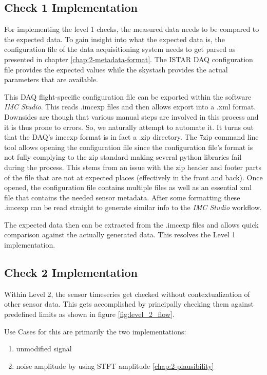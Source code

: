 \subsection{Check 1 Implementation}

For implementing the level 1 checks, the measured data needs to be compared to the expected data. To gain insight into what the expected data is, the configuration file of the data acquisitioning system needs to get parsed as presented in chapter \ref{chap:2-metadata-format}. The ISTAR DAQ configuration file provides the expected values while the skystash provides the actual parameters that are available.

This DAQ flight-specific configuration file can be exported within the software \textit{IMC Studio}. This reads .imcexp files and then allows export into a .xml format. Downsides are though that various manual steps are involved in this process and it is thus prone to errors. So, we naturally attempt to automate it. It turns out that the DAQ's imcexp format is in fact a .zip directory. The 7zip command line tool allows opening the configuration file since the configuration file's format is not fully complying to the zip standard making several python libraries fail during the process. This stems from an issue with the zip header and footer parts of the file that are not at expected places (effectively in the front and back). Once opened, the configuration file contains multiple files as well as an essential xml file that contains the needed sensor metadata. After some formatting these .imcexp can be read straight to generate similar info to the \textit{IMC Studio} workflow.

The expected data then can be extracted from the .imcexp files and allows quick comparison against the actually generated data. This resolves the Level 1 implementation.

\subsection{Check 2 Implementation}

Within Level 2, the sensor timeseries get checked without contextualization of other sensor data. This gets accomplished by principally checking them against predefined limits as shown in figure \ref{fig:level_2_flow}.

Use Cases for this are primarily the two implementations:

\begin{enumerate}
    \item unmodified signal
    \item noise amplitude by using STFT amplitude \ref{chap:2-plausibility}
\end{enumerate}

